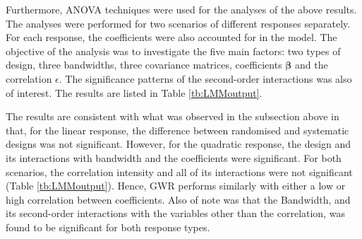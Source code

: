 \documentclass[a4paper]{article} 	%
\begin{document}
Furthermore, ANOVA techniques were used for the analyses of the above results. The analyses were performed for two scenarios of different responses separately. For each response, the coefficients were also accounted for in the model. The objective of the analysis was to investigate the five main factors: two types of design, three bandwidths, three covariance matrices, coefficients $\bm{\beta}$ and the correlation $\epsilon$. The significance patterns of the second-order interactions was also of interest. The results are listed in Table \ref{tb:LMMoutput}. 

The results are consistent with what was observed in the subsection above in that, for the linear response, the difference between randomised and systematic designs was not significant. However, for the quadratic response, the design and its interactions with bandwidth and the coefficients were significant. For both scenarios, the correlation intensity and all of its interactions were not significant (Table \ref{tb:LMMoutput}). Hence, GWR performs similarly with either a low or high correlation between coefficients. Also of note was that the Bandwidth, and its second-order interactions with the variables other than the correlation, was found to be significant for both response types. 
\end{document}
